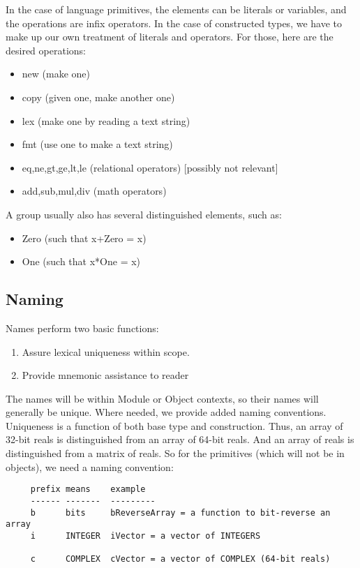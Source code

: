 In the case of language primitives, the elements can be
literals or variables, and the operations are infix
operators.  In the case of constructed types, we have to
make up our own treatment of literals and operators.  For
those, here are the desired operations:
\begin{itemize}
   \item new (make one)
   \item copy (given one, make another one)
   \item lex (make one by reading a text string)
   \item fmt (use one to make a text string)
   \item eq,ne,gt,ge,lt,le (relational operators) [possibly not
     relevant]
   \item add,sub,mul,div (math operators)
\end{itemize}

A group usually also has several distinguished elements,
such as:
\begin{itemize}
  \item Zero (such that x+Zero = x)
  \item One (such that x*One = x)
\end{itemize}

\subsection{Naming}
Names perform two basic functions:
\begin{enumerate}
  \item Assure lexical uniqueness within scope.
  \item Provide mnemonic assistance to reader
\end{enumerate}

The names will be within Module or Object contexts, so their
names will generally be unique.  Where needed, we provide
added naming conventions.  Uniqueness is a function of both
base type and construction.  Thus, an array of 32-bit reals
is distinguished from an array of 64-bit reals.  And an
array of reals is distinguished from a matrix of reals.  So
for the primitives (which will not be in objects), we need a
naming convention:
\begin{tt} \begin{verbatim}
     prefix means    example
     ------ -------  ---------
     b      bits     bReverseArray = a function to bit-reverse an array
     i      INTEGER  iVector = a vector of INTEGERS
     
     c      COMPLEX  cVector = a vector of COMPLEX (64-bit reals)
     
\end{verbatim} \end{tt}

